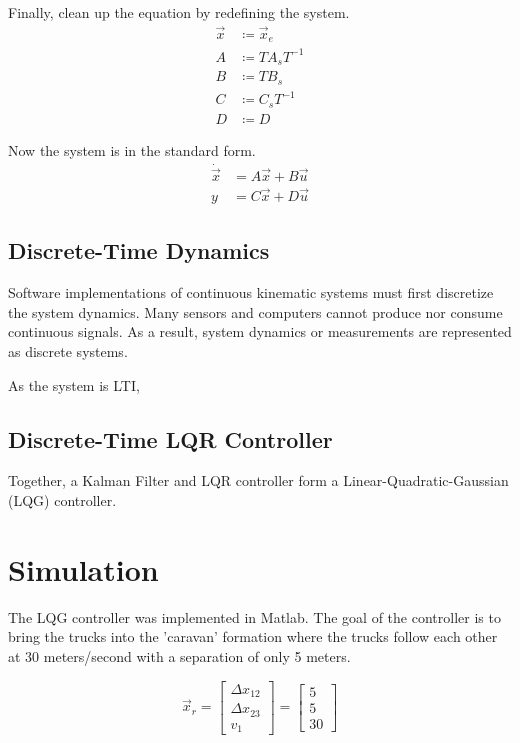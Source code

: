 \documentclass[12pt,onecolumn,reqno]{amsart}
\begin{document}
Finally, clean up the equation by redefining the system.
\begin{align*}
  \vec{x} &\coloneqq \vec{x}_{e}    \\
  A       &\coloneqq T A_{s} T^{-1} \\
  B       &\coloneqq T B_{s}        \\
  C       &\coloneqq C_{s} T^{-1}   \\
  D       &\coloneqq D
\end{align*}

Now the system is in the standard form.
\begin{align*}
  \dot{\vec{x}} &= A \vec{x} + B \vec{u} \\
  y &= C \vec{x} + D \vec{u}
\end{align*}


\subsection{Discrete-Time Dynamics}
Software implementations of continuous kinematic systems must first discretize
the system dynamics. Many sensors and computers cannot produce nor consume
continuous signals. As a result, system dynamics or measurements are
represented as discrete systems. 

As the system is LTI, 



\subsection{Discrete-Time LQR Controller}


Together, a Kalman Filter and LQR controller form a Linear-Quadratic-Gaussian
(LQG) controller. 


\section{Simulation}
The LQG controller was implemented in Matlab. The goal of the controller is to
bring the trucks into the 'caravan' formation where the trucks follow each other
at 30 meters/second with a separation of only 5 meters.

\begin{equation*}
  \vec{x}_{r} = 
  \begin{bmatrix}
    \Delta x_{12} \\ 
    \Delta x_{23} \\ 
    v_{1}
  \end{bmatrix} 
  =
  \begin{bmatrix}
    5 \\
    5 \\
    30
  \end{bmatrix} 
\end{equation*}
\end{document}
